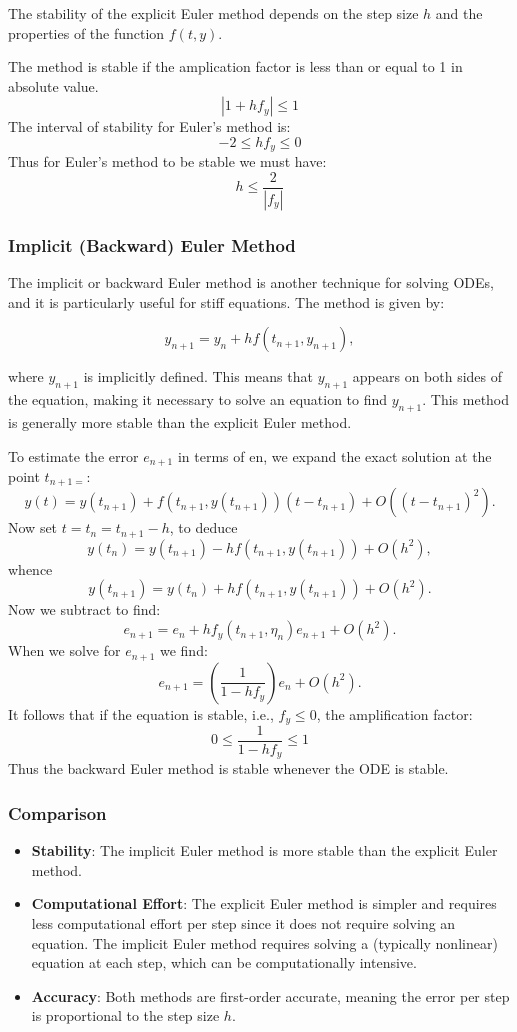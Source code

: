 \documentclass[a4paper,12pt,french]{article}
\begin{document}
The stability of the explicit Euler method depends on the step size \(h\) and the properties of the function \(f(t, y)\).

The method is stable if the amplication factor is less than or equal to 1 in absolute value. 
$$|1 + hf_y| \leq 1$$
The interval of stability for Euler’s method is:
$$ -2 \leq h f_y \leq 0$$
Thus for Euler’s method to be stable we must have:
$$
h \leq \frac{2}{|f_y|}
$$

\subsubsection{Implicit (Backward) Euler Method}
The implicit or backward Euler method is another technique for solving ODEs, and it is particularly useful for stiff equations. The method is given by:

\[
y_{n+1} = y_n + h f(t_{n+1}, y_{n+1}),
\]

where \(y_{n+1}\) is implicitly defined. This means that \(y_{n+1}\) appears on both sides of the equation, making it necessary to solve an equation to find \(y_{n+1}\). This method is generally more stable than the explicit Euler method.

To estimate the error $e_{n+1}$ in terms of en, we expand the exact solution at the point $t_{n+1=}$:
$$
y(t) = y(t_{n+1}) + f(t_{n+1}, y(t_{n+1}))(t - t_{n+1}) + O((t - t_{n+1})^2
).$$
Now set $t = t_n = t_{n+1} - h$, to deduce
$$
y(t_n) = y(t_{n+1}) - hf(t_{n+1}, y(t_{n+1})) + O(h^2),
$$
whence
$$
y(t_{n+1}) = y(t_n) + hf(t_{n+1}, y(t_{n+1})) + O(h^2).$$
Now we subtract to find:
$$
e_{n+1} = e_n + h f_y(t_{n+1}, \eta_n)e_{n+1} + O(h^2).
$$
When we solve for $e_{n+1}$ we find:
$$
e_{n+1} = \left(\frac{1}{1 - h f_y} \right)e_n + O(h^2).$$
It follows that if the equation is stable, i.e., $f_y \leq 0$, the amplification factor:
$$0 \leq \frac{1}{1 - hf_y} \leq 1$$ 
Thus the backward Euler method is stable whenever the ODE is stable.

\subsubsection*{Comparison}

\begin{itemize}
    \item \textbf{Stability}: The implicit Euler method is more stable than the explicit Euler method.
    \item \textbf{Computational Effort}: The explicit Euler method is simpler and requires less computational effort per step since it does not require solving an equation. The implicit Euler method requires solving a (typically nonlinear) equation at each step, which can be computationally intensive.
    \item \textbf{Accuracy}: Both methods are first-order accurate, meaning the error per step is proportional to the step size \(h\).
\end{itemize}
\end{document}
